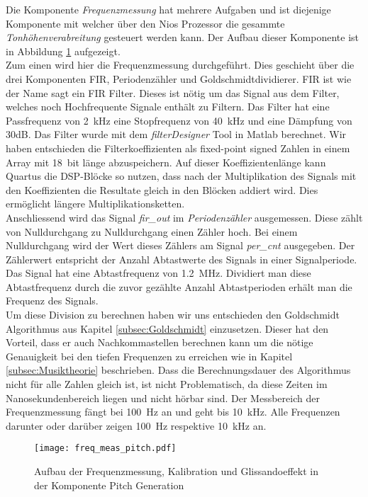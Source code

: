 Die Komponente \textit{Frequenzmessung} hat mehrere Aufgaben und ist diejenige Komponente mit welcher über den Nios Prozessor die gesammte \textit{Tonhöhenverabreitung} gesteuert werden kann. Der Aufbau dieser Komponente ist in Abbildung \ref{img:freq_meas_pitch} aufgezeigt.\\
Zum einen wird hier die Frequenzmessung durchgeführt. Dies geschieht über die drei Komponenten FIR, Periodenzähler und Goldschmidtdividierer. FIR ist wie der Name sagt ein FIR Filter. Dieses ist nötig um das Signal aus dem Filter, welches noch Hochfrequente Signale enthält zu Filtern. Das Filter hat eine Passfrequenz von \SI{2}{kHz} eine Stopfrequenz von \SI{40}{kHz} und eine Dämpfung von 30dB. Das Filter wurde mit dem \textit{filterDesigner} Tool in Matlab berechnet. Wir haben entschieden die Filterkoeffizienten als fixed-point signed Zahlen in einem Array mit \SI{18}{bit} länge abzuspeichern. Auf dieser Koeffizientenlänge kann Quartus die DSP-Blöcke so nutzen, dass nach der Multiplikation des Signals mit den Koeffizienten die Resultate gleich in den Blöcken addiert wird. Dies ermöglicht längere Multiplikationsketten. \cite{Cyclone_V}\\
Anschliessend wird das Signal \textit{fir\_out} im \textit{Periodenzähler} ausgemessen. Diese zählt von Nulldurchgang zu Nulldurchgang einen Zähler hoch. Bei einem Nulldurchgang wird der Wert dieses Zählers am Signal \textit{per\_cnt} ausgegeben. Der Zählerwert entspricht der Anzahl Abtastwerte des Signals in einer Signalperiode. \\
Das Signal hat eine Abtastfrequenz von \SI{1.2}{MHz}. Dividiert man diese Abtastfrequenz durch die zuvor gezählte Anzahl Abtastperioden erhält man die Frequenz des Signals.\\ Um diese Division zu berechnen haben wir uns entschieden den Goldschmidt Algorithmus aus Kapitel \ref{subsec:Goldschmidt} einzusetzen. Dieser hat den Vorteil, dass er auch Nachkommastellen berechnen kann um die nötige Genauigkeit bei den tiefen Frequenzen zu erreichen wie in Kapitel \ref{subsec:Musiktheorie} beschrieben. Dass die Berechnungsdauer des Algorithmus nicht für alle Zahlen gleich ist, ist nicht Problematisch, da diese Zeiten im Nanosekundenbereich liegen und nicht hörbar sind. Der Messbereich der Frequenzmessung fängt bei \SI{100}{Hz} an und geht bis \SI{10}{kHz}. Alle Frequenzen darunter oder darüber zeigen \SI{100}{Hz} respektive \SI{10}{kHz} an.

\begin{figure}[h!]
	\centering
	\texttt{[image: freq\_meas\_pitch.pdf]}
	\caption{Aufbau der Frequenzmessung, Kalibration und Glissandoeffekt in der Komponente Pitch Generation} 
	\label{img:freq_meas_pitch}
\end{figure}  

